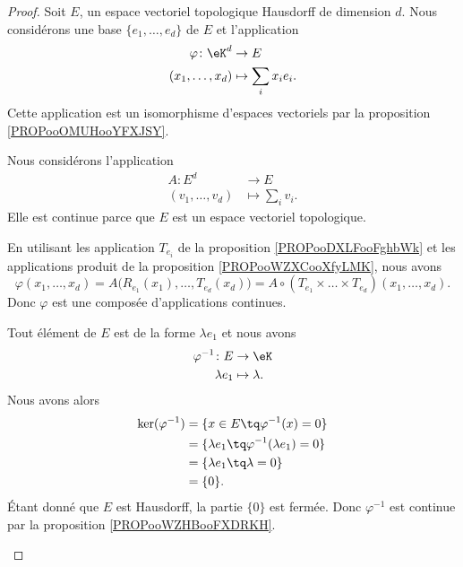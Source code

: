 \begin{proof}
	Soit \( E\), un espace vectoriel topologique Hausdorff de dimension \( d\). Nous considérons une base \( \{ e_1,\ldots,e_d \}\) de \( E\) et l'application
	\begin{equation}
		\begin{aligned}
			\varphi\colon \eK^d & \to E                 \\
			(x_1,\ldots,x_d)    & \mapsto \sum_ix_ie_i.
		\end{aligned}
	\end{equation}
	Cette application est un isomorphisme d'espaces vectoriels par la proposition \ref{PROPooOMUHooYFXJSY}.

	\begin{subproof}
				\label{SPITEMooXXKTooEsRBbL}
		Nous considérons l'application
		\begin{equation}
			\begin{aligned}
				A\colon E^d      & \to E              \\
				(v_1,\ldots,v_d) & \mapsto \sum_iv_i.
			\end{aligned}
		\end{equation}
		Elle est continue parce que  \( E\) est un espace vectoriel topologique.

		En utilisant les application \( T_{e_i}\) de la proposition \ref{PROPooDXLFooFghbWk} et les applications produit de la proposition \ref{PROPooWZXCooXfyLMK}, nous avons
		\begin{equation}
			\varphi(x_1,\ldots,x_d)=A\big( R_{e_1}(x_1),\ldots,T_{e_d}(x_d) \big)=A\circ (  T_{e_1}\times\ldots \times T_{e_d}  )(x_1,\ldots,x_d).
		\end{equation}
		Donc \( \varphi\) est une composée d'applications continues.

		\spitem[\( \varphi^{-1}\) est continue si \( d=1\)]
		Tout élément de \( E\) est de la forme \( \lambda e_1\) et nous avons
		\begin{equation}
			\begin{aligned}
				\varphi^{-1}\colon E & \to \eK          \\
				\lambda e_1          & \mapsto \lambda.
			\end{aligned}
		\end{equation}
		Nous avons alors
		\begin{subequations}
			\begin{align}
				\ker(\varphi^{-1}) & =\{ x\in E\tq \varphi^{-1}(x)=0 \}                \\
				                   & =\{ \lambda e_1\tq \varphi^{-1}(\lambda e_1)=0 \} \\
				                   & =\{ \lambda e_1\tq \lambda=0 \}                   \\
				                   & =\{ 0 \}.
			\end{align}
		\end{subequations}
		Étant donné que \( E\) est Hausdorff, la partie \( \{ 0 \}\) est fermée. Donc \( \varphi^{-1}\) est continue par la proposition \ref{PROPooWZHBooFXDRKH}.


\end{subproof}
\end{proof}
